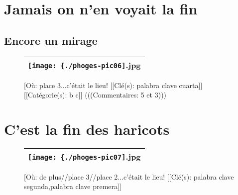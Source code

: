 \documentclass[12pt,twocolumn,french]{article}
\begin{document}
\section{Jamais on n'en voyait la fin}
%
%
\subsection{Encore un mirage}
%
  \begin{figure}[H]
    \label{phoges-pic06.jpg}
    \noindent \centering{}
    \begin{tabular}{|c|}
      \hline
          \texttt{[image: \{./phoges-pic06]}.jpg}
        \tabularnewline \hline
    \end{tabular}
    \vspace{2mm}
    \caption{
       [Où: place 3...c'était le lieu!
      [[Clé(s): palabra clave cuarta]] 
      [[Catégorie(s): b c]] 
      (((Commentaires: 5 et 3)))
    }
  \end{figure}
\clearpage
%
\section{C'est la fin des haricots}
%
  \begin{figure}[H]
    \label{phoges-pic07.jpg}
    \noindent \centering{}
    \begin{tabular}{|c|}
      \hline
          \texttt{[image: \{./phoges-pic07]}.jpg}
        \tabularnewline \hline
    \end{tabular}
    \vspace{2mm}
    \caption{
       [Où: de plus//place 3//place 2...c'était le lieu!
      [[Clé(s): palabra clave segunda,palabra clave premera]] 
    }
  \end{figure}
%
\end{document}

